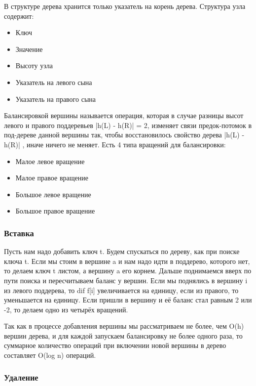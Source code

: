 \documentclass[12pt]{article}
\begin{document}
В	структуре дерева хранится только указатель на корень дерева. Структура узла содержит:
\begin{itemize}
    \item Ключ
    \item Значение
    \item Высоту узла
    \item Указатель на левого сына
    \item Указатель на правого сына
\end{itemize}

Балансировкой вершины называется операция, которая в случае разницы высот левого и правого поддеревьев |h(L) - h(R)| = 2, изменяет связи предок-потомок в под-дереве данной вершины так, чтобы восстановилось свойство дерева |h(L) - h(R)| , иначе ничего не меняет. Есть 4 типа вращений для балансировки:

\begin{itemize}
    \item Малое левое вращение
    \item Малое правое вращение
    \item Большое левое вращение
    \item Большое правое вращение
\end{itemize}
\subsubsection*{Вставка}

Пусть нам надо добавить ключ t. Будем спускаться по дереву, как при поиске ключа t. Если мы стоим в вершине a и нам надо идти в поддерево, которого нет, то делаем ключ t листом, а вершину a его корнем. Дальше поднимаемся вверх по пути поиска и пересчитываем баланс у вершин. Если мы поднялись в вершину i из левого поддерева, то dif f[i] увеличивается на единицу, если из правого, то уменьшается на единицу. Если пришли в вершину и её баланс стал равным 2 или -2, то делаем одно из четырёх вращений.

Так как в процессе добавления вершины мы рассматриваем не более, чем O(h) вершин дерева, и для каждой запускаем балансировку не более одного раза, то суммарное количество операций при включении новой вершины в дерево составляет O(log n) операций.


\subsubsection*{Удаление}
\end{document}
